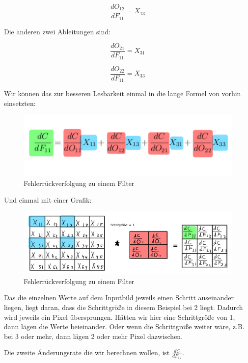 \documentclass[12pt]{article}
\begin{document}
$$\frac{dO_{12}} {dF_{11}} = X_{13}$$

Die anderen zwei Ableitungen sind:


$$\frac{dO_{21}} {dF_{11}} = X_{31}$$

$$\frac{dO_{22}} {dF_{11}} = X_{33}$$

Wir können das zur besseren Lesbarkeit einmal in die lange Formel von vorhin einsetzten:


\begin{figure}[H]
\centering
\includegraphics[scale=0.25]{Images/015_BackProp_Delta.png}
\caption{Fehlerrückverfolgung zu einem Filter}
\label{Fehlerrückverfolgung zu einem Filter v1}
\end{figure}

Und einmal mit einer Grafik:
\begin{figure}[H]
\centering
\includegraphics[scale=0.30]{./Images/013_Backpropagation_Filter.png}
\caption{Fehlerrückverfolgung zu einem Filter}
\label{Fehlerrückverfolgung zu einem Filter v1}
\end{figure}

Das die einzelnen Werte auf dem Inputbild jeweils einen Schritt auseinander liegen, liegt daran, dass die Schrittgröße in diesem Beispiel bei 2 liegt. Dadurch wird jeweils ein Pixel übersprungen. Hätten wir hier eine Schrittgröße von 1, dann lägen die Werte beieinander. Oder wenn die Schrittgröße weiter wäre, z.B. bei 3 oder mehr, dann lägen 2 oder mehr Pixel dazwischen.

Die zweite Änderungsrate die wir berechnen wollen, ist $\frac{dC}{dF_{12}}$. 
\end{document}
